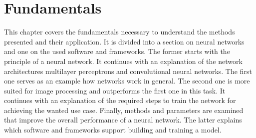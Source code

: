 \chapter{Fundamentals}
This chapter covers the fundamentals necessary to understand the methods presented and their application.
It is divided into a section on neural networks and one on the used software and frameworks.
The former starts with the principle of a neural network.
It continues with an explanation of the network architectures multilayer perceptrons and convolutional neural networks.
The first one serves as an example how networks work in general.
The second one is more suited for image processing and outperforms the first one in this task.
It continues with an explanation of the required steps to train the network for achieving the wanted use case.
Finally, methods and parameters are examined that improve the overall performance of a neural network.
The latter explains which software and frameworks support building and training a model.


